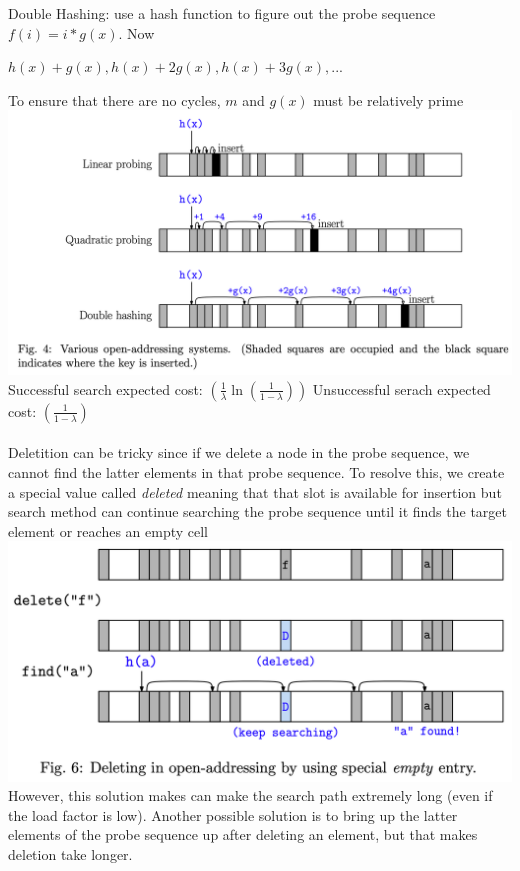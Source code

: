 \documentclass{article}
\begin{document}
  Double Hashing: use a hash function to figure out the probe sequence $f(i) = i*g(x)$. Now
  \begin{center} 
    $h(x) + g(x), h(x) + 2g(x), h(x) + 3g(x), ...$
  \end{center}
  To ensure that there are no cycles, $m$ and $g(x)$ must be relatively prime\\
  \includegraphics[width=\textwidth]{HashProbe}
  Successful search expected cost: $(\frac{1}{\lambda}\ln(\frac{1}{1 - \lambda}))$ \quad Unsuccessful serach expected cost: $(\frac{1}{1 - \lambda})$ \\ \\
  Deletition can be tricky since if we delete a node in the probe sequence, we cannot find the latter elements in that probe sequence. To resolve this, we create a special value called \textit{deleted} meaning that that slot is available for insertion but search method can continue searching the probe sequence until it finds the target element or reaches an empty cell \\
  \includegraphics[width=\textwidth]{HashDeletion}
  However, this solution makes can make the search path extremely long (even if the load factor is low). Another possible solution is to bring up the latter elements of the probe sequence up after deleting an element, but that makes deletion take longer.\\
  \newpage
\end{document}
